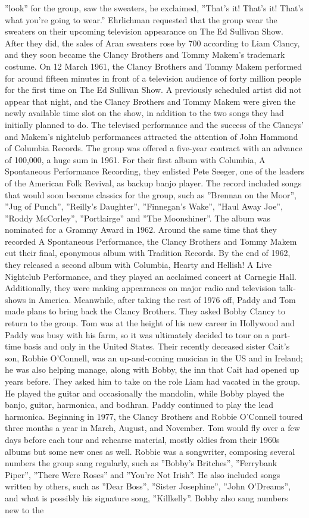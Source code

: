 \documentclass[11pt,a4paper, onecolumn]{article}
\begin{document}
''look'' for the group, saw the sweaters, he exclaimed, ''That's it! That's it! That's what you're going to wear.'' Ehrlichman requested that the group wear the sweaters on their upcoming television appearance on The Ed Sullivan Show. After they did, the sales of Aran sweaters rose by 700  according to Liam Clancy, and they soon became the Clancy Brothers and Tommy Makem's trademark costume. On 12 March 1961, the Clancy Brothers and Tommy Makem performed for around fifteen minutes in front of a television audience of forty million people for the first time on The Ed Sullivan Show. A previously scheduled artist did not appear that night, and the Clancy Brothers and Tommy Makem were given the newly available time slot on the show, in addition to the two songs they had initially planned to do. The televised performance and the success of the Clancys' and Makem's nightclub performances attracted the attention of John Hammond of Columbia Records. The group was offered a five-year contract with an advance of  100,000, a huge sum in 1961. For their first album with Columbia, A Spontaneous Performance Recording, they enlisted Pete Seeger, one of the leaders of the American Folk Revival, as backup banjo player. The record included songs that would soon become classics for the group, such as ''Brennan on the Moor'', ''Jug of Punch'', ''Reilly's Daughter'', ''Finnegan's Wake'', ''Haul Away Joe'', ''Roddy McCorley'', ''Portlairge'' and ''The Moonshiner''. The album was nominated for a Grammy Award in 1962. Around the same time that they recorded A Spontaneous Performance, the Clancy Brothers and Tommy Makem cut their final, eponymous album with Tradition Records. By the end of 1962, they released a second album with Columbia, Hearty and Hellish! A Live Nightclub Performance, and they played an acclaimed concert at Carnegie Hall. Additionally, they were making appearances on major radio and television talk-shows in America. Meanwhile, after taking the rest of 1976 off, Paddy and Tom made plans to bring back the Clancy Brothers. They asked Bobby Clancy to return to the group. Tom was at the height of his new career in Hollywood and Paddy was busy with his farm, so it was ultimately decided to tour on a part-time basis and only in the United States. Their recently deceased sister Cait's son, Robbie O'Connell, was an up-and-coming musician in the US and in Ireland; he was also helping manage, along with Bobby, the inn that Cait had opened up years before. They asked him to take on the role Liam had vacated in the group. He played the guitar and occasionally the mandolin, while Bobby played the banjo, guitar, harmonica, and bodhran. Paddy continued to play the lead harmonica. Beginning in 1977, the Clancy Brothers and Robbie O'Connell toured three months a year in March, August, and November. Tom would fly over a few days before each tour and rehearse material, mostly oldies from their 1960s albums but some new ones as well. Robbie was a songwriter, composing several numbers the group sang regularly, such as ''Bobby's Britches'', ''Ferrybank Piper'', ''There Were Roses'' and ''You're Not Irish''. He also included songs written by others, such as ''Dear Boss'', ''Sister Josephine'', ''John O'Dreams'', and what is possibly his signature song, ''Killkelly''. Bobby also sang numbers new to the 
\end{document}
